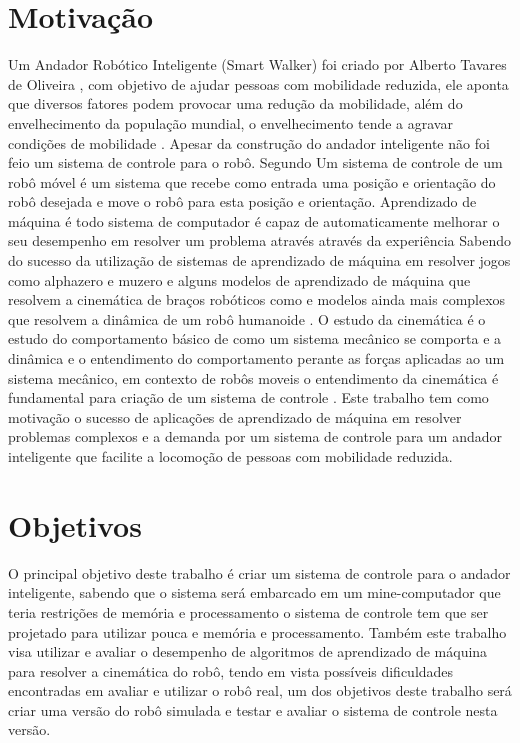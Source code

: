 \label{Cap:Introducao}

\section{Motivação}

Um Andador Robótico Inteligente (Smart Walker) foi criado por Alberto Tavares de Oliveira ,
com objetivo de ajudar pessoas com mobilidade reduzida, ele aponta que
diversos fatores podem provocar uma redução da mobilidade, além do 
envelhecimento da população mundial, o envelhecimento tende a agravar
condições de mobilidade \cite{oliveira2022projeto}. Apesar da construção
do andador inteligente não foi feio um sistema de controle para o robô.
Segundo \cite{siegwart2011introduction} Um sistema de controle de um
robô móvel  é um sistema que recebe como entrada uma posição
e orientação do robô desejada e move o robô para esta posição e orientação.
Aprendizado de máquina é todo
sistema de computador é capaz de automaticamente melhorar o seu desempenho
em resolver um problema através através da experiência \cite{mitchell1990machine}
Sabendo do sucesso da utilização de sistemas de aprendizado de máquina em
resolver jogos como alphazero \cite{silver2017mastering} e muzero
\cite{schrittwieser2020mastering} e alguns modelos de aprendizado de máquina
que resolvem a cinemática de braços robóticos como \cite{cavalcanti2017self}
e modelos ainda mais complexos que resolvem a dinâmica de um robô humanoide
\cite{phaniteja2017deep}. O estudo da cinemática é o estudo do comportamento
básico de como um sistema mecânico se comporta e a dinâmica e o entendimento
do comportamento perante as forças aplicadas ao um sistema mecânico, em contexto
de robôs moveis o entendimento da cinemática é fundamental para criação de um
sistema de controle \cite{siegwart2011introduction}. Este trabalho tem como motivação o sucesso de
aplicações de aprendizado de máquina em resolver problemas complexos e a
demanda por um sistema de controle para um andador inteligente que facilite a
locomoção de pessoas com mobilidade reduzida. 

\section{Objetivos}

O principal objetivo deste trabalho é criar um  sistema de
controle para o andador inteligente, sabendo que o sistema será
embarcado em um mine-computador que teria restrições de memória e
processamento o sistema de controle tem que ser projetado para utilizar
pouca e memória e processamento.
Também este trabalho visa utilizar e avaliar o desempenho de algoritmos
de aprendizado de máquina para resolver a cinemática do robô, tendo em
vista possíveis dificuldades encontradas em avaliar e utilizar o robô real,
um dos objetivos deste trabalho será criar uma versão do robô simulada e
testar e avaliar o sistema de controle nesta versão.

